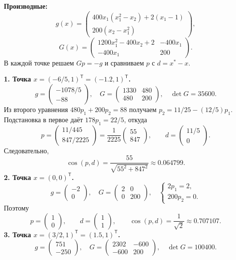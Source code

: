 \documentclass[12pt,a4paper]{article}
\newcommand{\T}{^{\mathsf T}}
\begin{document}
\textbf{Производные:}
\[
g(x)=\begin{pmatrix}400x_1(x_1^2-x_2)+2(x_1-1)\\200(x_2-x_1^2)\end{pmatrix},
\]
\[
G(x)=\begin{pmatrix}1200x_1^2-400x_2+2&-400x_1\\-400x_1&200\end{pmatrix}.
\]
В каждой точке решаем $Gp=-g$ и сравниваем $p$ с $d=x^*-x$.

\textbf{1. Точка $x=(-6/5,1)\T=(-1.2,1)\T$.}
\[
g=\begin{pmatrix}-1078/5\\-88\end{pmatrix},\quad
G=\begin{pmatrix}1330&480\\480&200\end{pmatrix},\quad\det G=35600.
\]
Из второго уравнения $480p_1+200p_2=88$ получаем $p_2=11/25-(12/5)p_1$.
Подстановка в первое даёт $178p_1=22/5$, откуда
\[
p=\begin{pmatrix}11/445\\847/2225\end{pmatrix}
=\frac1{2225}\begin{pmatrix}55\\847\end{pmatrix},\qquad d=\begin{pmatrix}11/5\\0\end{pmatrix}.
\]
Следовательно,
\[
\cos(p,d)=\frac{55}{\sqrt{55^2+847^2}}\approx0.064799.
\]
\textbf{2. Точка $x=(0,0)\T$.}
\[
g=\begin{pmatrix}-2\\0\end{pmatrix},\quad
G=\begin{pmatrix}2&0\\0&200\end{pmatrix},\quad
\begin{cases}2p_1=2,\\200p_2=0.\end{cases}
\]
Поэтому
\[
p=\begin{pmatrix}1\\0\end{pmatrix},\qquad d=\begin{pmatrix}1\\1\end{pmatrix},\qquad
\cos(p,d)=\frac1{\sqrt2}\approx0.707107.
\]
\textbf{3. Точка $x=(3/2,1)\T=(1.5,1)\T$.}
\[
g=\begin{pmatrix}751\\-250\end{pmatrix},\quad
G=\begin{pmatrix}2302&-600\\-600&200\end{pmatrix},\quad\det G=100400.
\]
\end{document}
